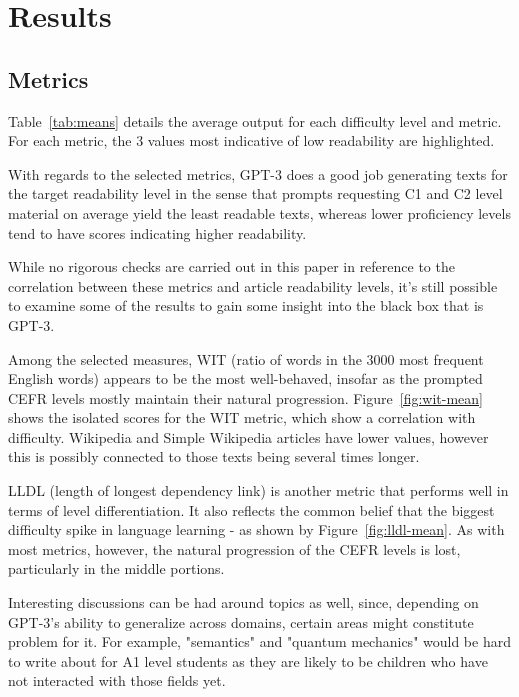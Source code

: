 \documentclass[11pt]{article}
\begin{document}
\section{Results}

\subsection{Metrics}



Table~\ref{tab:means} details the average output for each difficulty level and metric. For each metric, the 3 values most indicative of low readability are highlighted.

With regards to the selected metrics, GPT-3 does a good job generating texts for the target readability level in the sense that prompts requesting C1 and C2 level material on average yield the least readable texts, whereas lower proficiency levels tend to have scores indicating higher readability.
 
While no rigorous checks are carried out in this paper in reference to the correlation between these metrics and article readability levels, it's still possible to examine some of the results to gain some insight into the black box that is GPT-3.



Among the selected measures, WIT (ratio of words in the 3000 most frequent English words) appears to be the most well-behaved, insofar as the prompted CEFR levels mostly maintain their natural progression. Figure~\ref{fig:wit-mean} shows the isolated scores for the WIT metric, which show a correlation with difficulty. Wikipedia and Simple Wikipedia articles have lower values, however this is possibly connected to those texts being several times longer.



LLDL (length of longest dependency link) is another metric that performs well in terms of level differentiation. It also reflects the common belief that the biggest difficulty spike in language learning - as shown by Figure~\ref{fig:lldl-mean}. As with most metrics, however, the natural progression of the CEFR levels is lost, particularly in the middle portions.

Interesting discussions can be had around topics as well, since, depending on GPT-3's ability to generalize across domains, certain areas might constitute problem for it. For example, "semantics" and "quantum mechanics" would be hard to write about for A1 level students as they are likely to be children who have not interacted with those fields yet.
\end{document}
